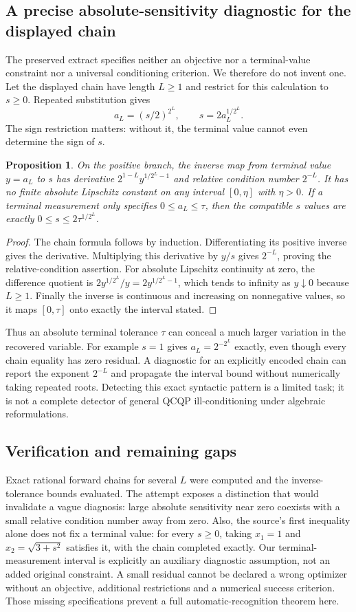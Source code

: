 \documentclass[11pt]{article}
\newtheorem{proposition}{Proposition}
\begin{document}
\subsection{A precise absolute-sensitivity diagnostic for the displayed chain}
The preserved extract specifies neither an objective nor a terminal-value constraint nor a universal conditioning criterion. We therefore do not invent one. Let the displayed chain have length $L\ge1$ and restrict for this calculation to $s\ge0$. Repeated substitution gives
\[
a_L=(s/2)^{2^L},\qquad s=2a_L^{1/2^L}.
\]
The sign restriction matters: without it, the terminal value cannot even determine the sign of $s$.
\begin{proposition}
On the positive branch, the inverse map from terminal value $y=a_L$ to $s$ has derivative $2^{1-L}y^{1/2^L-1}$ and relative condition number $2^{-L}$. It has no finite absolute Lipschitz constant on any interval $[0,\eta]$ with $\eta>0$. If a terminal measurement only specifies $0\le a_L\le\tau$, then the compatible $s$ values are exactly $0\le s\le2\tau^{1/2^L}$.
\end{proposition}
\begin{proof}
The chain formula follows by induction. Differentiating its positive inverse gives the derivative. Multiplying this derivative by $y/s$ gives $2^{-L}$, proving the relative-condition assertion. For absolute Lipschitz continuity at zero, the difference quotient is $2y^{1/2^L}/y=2y^{1/2^L-1}$, which tends to infinity as $y\downarrow0$ because $L\ge1$. Finally the inverse is continuous and increasing on nonnegative values, so it maps $[0,\tau]$ onto exactly the interval stated.
\end{proof}
Thus an absolute terminal tolerance $\tau$ can conceal a much larger variation in the recovered variable. For example $s=1$ gives $a_L=2^{-2^L}$ exactly, even though every chain equality has zero residual. A diagnostic for an explicitly encoded chain can report the exponent $2^{-L}$ and propagate the interval bound without numerically taking repeated roots. Detecting this exact syntactic pattern is a limited task; it is not a complete detector of general QCQP ill-conditioning under algebraic reformulations.
\subsection{Verification and remaining gaps}
Exact rational forward chains for several $L$ were computed and the inverse-tolerance bounds evaluated. The attempt exposes a distinction that would invalidate a vague diagnosis: large absolute sensitivity near zero coexists with a small relative condition number away from zero. Also, the source's first inequality alone does not fix a terminal value: for every $s\ge0$, taking $x_1=1$ and $x_2=\sqrt{3+s^2}$ satisfies it, with the chain completed exactly. Our terminal-measurement interval is explicitly an auxiliary diagnostic assumption, not an added original constraint. A small residual cannot be declared a wrong optimizer without an objective, additional restrictions and a numerical success criterion. Those missing specifications prevent a full automatic-recognition theorem here.
\end{document}
